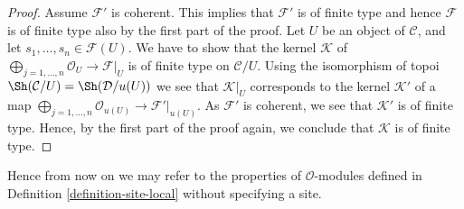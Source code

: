 \begin{proof}
\medskip\noindent
Assume $\mathcal{F}'$ is coherent. This implies that $\mathcal{F}'$
is of finite type and hence $\mathcal{F}$ is of finite type also by the
first part of the proof. Let $U$ be an object of $\mathcal{C}$, and let
$s_1, \ldots, s_n \in \mathcal{F}(U)$. We have to show that the kernel
$\mathcal{K}$ of
$\bigoplus_{j = 1, \ldots, n} \mathcal{O}_U \to \mathcal{F}|_U$
is of finite type on $\mathcal{C}/U$. Using the isomorphism of topoi
$\Sh(\mathcal{C}/U) = \Sh(\mathcal{D}/u(U))$
we see that $\mathcal{K}|_U$ corresponds to the kernel
$\mathcal{K}'$ of a map
$\bigoplus_{j = 1, \ldots, n} \mathcal{O}_{u(U)} \to \mathcal{F}'|_{u(U)}$.
As $\mathcal{F}'$ is coherent, we see that $\mathcal{K}'$ is of finite
type. Hence, by the first part of the proof again, we conclude
that $\mathcal{K}$ is of finite type.
\end{proof}

\noindent
Hence from now on we may refer to the properties of $\mathcal{O}$-modules
defined in Definition \ref{definition-site-local} without specifying a site.

